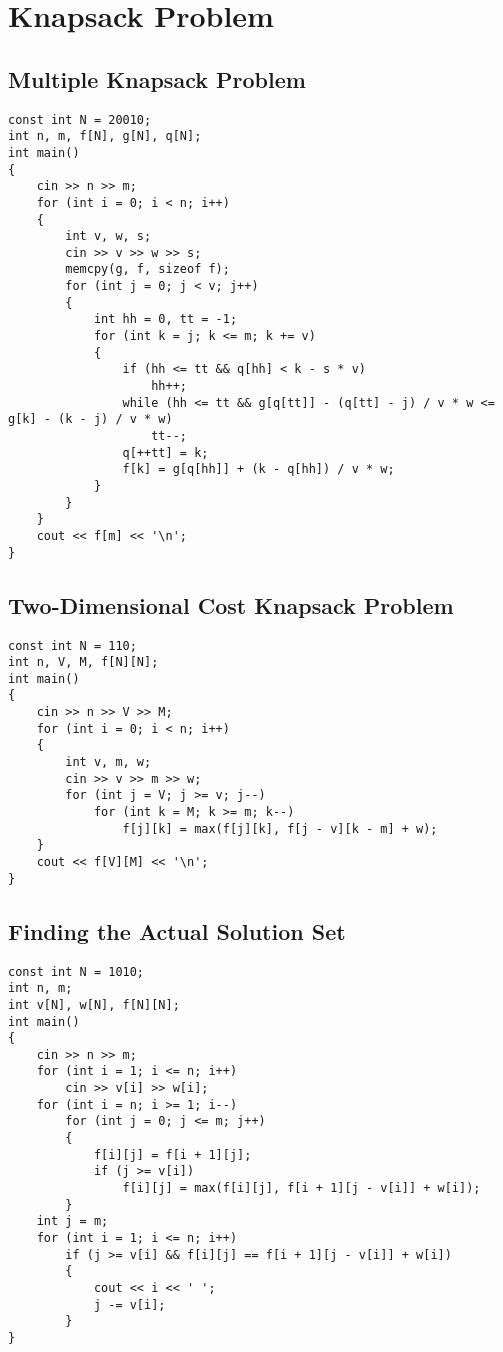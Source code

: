 \section{Knapsack Problem}
\subsection{Multiple Knapsack Problem}
\begin{lstlisting}
const int N = 20010;
int n, m, f[N], g[N], q[N];
int main()
{
    cin >> n >> m;
    for (int i = 0; i < n; i++)
    {
        int v, w, s;
        cin >> v >> w >> s;
        memcpy(g, f, sizeof f);
        for (int j = 0; j < v; j++)
        {
            int hh = 0, tt = -1;
            for (int k = j; k <= m; k += v)
            {
                if (hh <= tt && q[hh] < k - s * v)
                    hh++;
                while (hh <= tt && g[q[tt]] - (q[tt] - j) / v * w <= g[k] - (k - j) / v * w)
                    tt--;
                q[++tt] = k;
                f[k] = g[q[hh]] + (k - q[hh]) / v * w;
            }
        }
    }
    cout << f[m] << '\n';
}
\end{lstlisting}
\subsection{Two-Dimensional Cost Knapsack Problem}
\begin{lstlisting}
const int N = 110;
int n, V, M, f[N][N];
int main()
{
    cin >> n >> V >> M;
    for (int i = 0; i < n; i++)
    {
        int v, m, w;
        cin >> v >> m >> w;
        for (int j = V; j >= v; j--)
            for (int k = M; k >= m; k--)
                f[j][k] = max(f[j][k], f[j - v][k - m] + w);
    }
    cout << f[V][M] << '\n';
}
\end{lstlisting}
\subsection{Finding the Actual Solution Set}
\begin{lstlisting}
const int N = 1010;
int n, m;
int v[N], w[N], f[N][N];
int main()
{
    cin >> n >> m;
    for (int i = 1; i <= n; i++)
        cin >> v[i] >> w[i];
    for (int i = n; i >= 1; i--)
        for (int j = 0; j <= m; j++)
        {
            f[i][j] = f[i + 1][j];
            if (j >= v[i])
                f[i][j] = max(f[i][j], f[i + 1][j - v[i]] + w[i]);
        }
    int j = m;
    for (int i = 1; i <= n; i++)
        if (j >= v[i] && f[i][j] == f[i + 1][j - v[i]] + w[i])
        {
            cout << i << ' ';
            j -= v[i];
        }
}
\end{lstlisting}
